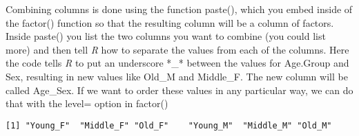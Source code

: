 \documentclass[
  12pt,
  letterpaper]{article}
\newenvironment{Shaded}{\begin{snugshade}}{\end{snugshade}}
\newcommand{\AttributeTok}[1]{\textcolor[rgb]{0.40,0.45,0.13}{#1}}
\newcommand{\CommentTok}[1]{\textcolor[rgb]{0.37,0.37,0.37}{#1}}
\newcommand{\FunctionTok}[1]{\textcolor[rgb]{0.28,0.35,0.67}{#1}}
\newcommand{\NormalTok}[1]{\textcolor[rgb]{0.00,0.23,0.31}{#1}}
\newcommand{\OtherTok}[1]{\textcolor[rgb]{0.00,0.23,0.31}{#1}}
\newcommand{\SpecialCharTok}[1]{\textcolor[rgb]{0.37,0.37,0.37}{#1}}
\newcommand{\StringTok}[1]{\textcolor[rgb]{0.13,0.47,0.30}{#1}}
\renewcommand\texttt[1]{{\ttfamily\color{BrickRed}#1}}
\begin{document}
Combining columns is done using the function \texttt{paste()}, which you
embed inside of the \texttt{factor()} function so that the resulting
column will be a column of factors. Inside \texttt{paste()} you list the
two columns you want to combine (you could list more) and then tell
\emph{R} how to separate the values from each of the columns. Here the
code tells \emph{R} to put an underscore *\_* between the values for
\texttt{Age.Group} and \texttt{Sex}, resulting in new values like
\texttt{Old\_M} and \texttt{Middle\_F}. The new column will be called
\texttt{Age\_Sex}. If we want to order these values in any particular
way, we can do that with the \texttt{level=} option in \texttt{factor()}

\begin{Shaded}
\end{Shaded}

\begin{verbatim}
[1] "Young_F"  "Middle_F" "Old_F"    "Young_M"  "Middle_M" "Old_M"   
\end{verbatim}

\begin{Shaded}
\end{Shaded}
\end{document}
